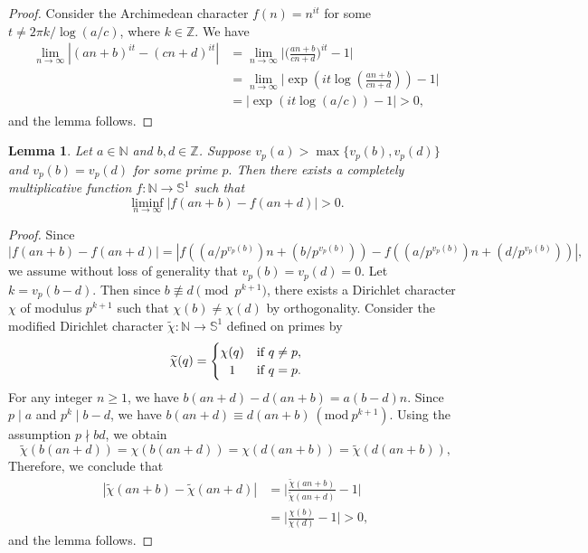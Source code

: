 \documentclass[12pt, reqno, a4paper]{amsart}
\newtheorem{lemma}{Lemma}[section]
\theoremstyle{definition}
\theoremstyle{remark}
\numberwithin{equation}{section}
\newcommand{\Mod}[1]{\ (\mathrm{mod}\ #1)}
\newcommand{\N}{\mathbb{N}}
\newcommand{\Z}{\mathbb{Z}}
\renewcommand{\geq}{\geqslant}
\begin{document}
 \begin{proof}
Consider the Archimedean character $f(n)=n^{it}$ for some $t\neq 2\pi k/\log(a/c)$, where $k \in \mathbb{Z}.$ We have
\begin{align*}
 \lim_{n\to\infty}  |(an+b)^{it} - (cn+d)^{it}| &= \lim_{n\to\infty} \bigg| \bigg(\frac{an+b}{cn+d}\bigg)^{it} -1\bigg| \\
 &=  \lim_{n\to\infty}  \bigg|  \exp \left(it \log \left(\frac{an+b}{cn+d} \right)\right) -1\bigg|\\
&= | \exp(it \log(a/c)) - 1| > 0,
\end{align*} 
and the lemma follows.
 \end{proof}


\begin{lemma} \label{lem:dio_a=c}
Let $a\in\N$ and $b,d\in\Z$. Suppose $v_{p}(a) > \max\{v_p(b),v_p(d)\}$ and $v_p(b) = v_p(d)$ for some prime $p.$ Then there exists a completely multiplicative function $f:\N\to \mathbb{S}^1$ such that
  \[ \liminf_{n\to\infty} |f(an+b)-f(an+d)| > 0. \]
\end{lemma}

\begin{proof}
Since
  \[ |f(an+b)-f(an+d)| = |f((a/p^{v_p(b)})n+(b/p^{v_p(b)}))-f((a/p^{v_p(b)})n+(d/p^{v_p(b)}))|, \]
we assume without loss of generality that $v_p(b)=v_p(d)=0$. Let $k=v_p(b-d).$ Then since $b\not\equiv d\pmod{p^{k+1}}$, there exists a Dirichlet character $\chi$ of modulus $p^{k+1}$ such that $\chi(b)\neq \chi(d)$ by orthogonality. Consider the modified Dirichlet character $\widetilde{\chi}: \mathbb{N} \to \mathbb{S}^1$ defined on primes by
    \[ \widetilde{\chi}(q) = \begin{cases}
        \chi(q) &\text{if }q\neq p, \\
      \hfil    1 &\text{if } q=p.
    \end{cases} \]
    For any integer $n \geq 1$, we have $b(an+d) - d(an+b) = a(b-d)n$. Since $p\mid a$ and $p^{k}\mid b-d$, we have $b(an+d) \equiv d(an+b) \Mod{p^{k+1}}$. Using the assumption $p\nmid b d$, we obtain
    \[ \widetilde{\chi}(b(an+d)) = \chi(b(an+d)) = \chi(d(an+b)) = \widetilde{\chi}(d(an+b)), \]
Therefore, we conclude that
    \begin{align*}
      |\widetilde{\chi}(an+b)-\widetilde{\chi}(an+d)| &= \bigg| \frac{\widetilde{\chi}(an+b)}{\widetilde{\chi}(an+d)} -1 \bigg| \\
      &= \bigg| \frac{\chi(b)}{\chi(d)} -1 \bigg| >0,
    \end{align*}
 and the lemma follows.   
\end{proof}
\end{document}
